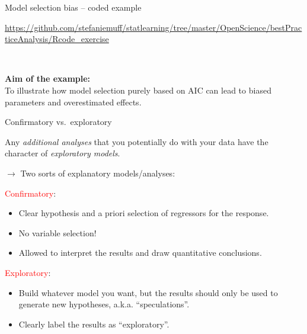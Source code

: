 \documentclass[
  10pt,
  ignorenonframetext,
]{beamer}
\begin{document}
\begin{frame}
\begin{block}{Model selection bias -- coded example}
\protect\hypertarget{model-selection-bias-coded-example}{}
\(~\)

\url{https://github.com/stefaniemuff/statlearning/tree/master/OpenScience/bestPracticeAnalysis/Rcode_exercise}

\(~\)

\begin{tcolorbox}
{\bf Aim of the example:} \\
To illustrate how model selection purely based on AIC can lead to biased parameters and overestimated effects.

\end{tcolorbox}
\end{block}
\end{frame}

\begin{frame}
\begin{block}{Confirmatory vs.~exploratory}
\protect\hypertarget{confirmatory-vs.-exploratory}{}
\(~\)

Any \emph{additional analyses} that you potentially do with your data
have the character of \emph{exploratory models}.

\vspace{2mm}

\(\rightarrow\) Two sorts of explanatory models/analyses:

\vspace{2mm}

\textcolor{red}{Confirmatory}:

\begin{tcolorbox}

\begin{itemize}
\item Clear hypothesis and a priori  selection of regressors for the response. 
\item No variable selection! 
\item Allowed to interpret the results and draw quantitative conclusions.  
\end{itemize}

\end{tcolorbox}

\pause

\textcolor{red}{Exploratory}:

\begin{tcolorbox}
\begin{itemize}
\item Build whatever model you want, but the results should only be used to generate new hypotheses, a.k.a. ``speculations''.
 \item Clearly label the results as ``exploratory''.
\end{itemize}
    
\end{tcolorbox}
\end{block}
\end{frame}
\end{document}
